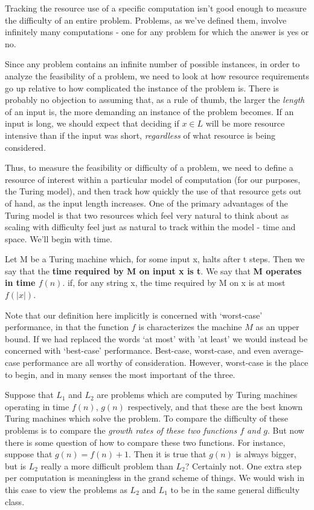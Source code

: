 Tracking the resource use of a specific computation isn't good enough to measure the difficulty of an entire problem. Problems, as we've defined them, involve infinitely many computations - one for any problem for which the answer is yes or no. 

Since any problem contains an infinite number of possible instances, in order to analyze the feasibility of a problem, we need to look at how resource requirements go up relative to how complicated the instance of the problem is. There is probably no objection to assuming that, as a rule of thumb, the larger the \textit{length} of an input is, the more demanding an instance of the problem becomes. If an input is long, we should expect that deciding if $x\in L$ will be more resource intensive than if the input was short, \textit{regardless} of what resource is being considered.

Thus, to measure the feasibility or difficulty of a problem, we need to define a resource of interest within a particular model of computation (for our purposes, the Turing model), and then track how quickly the use of that resource gets out of hand, as the input length increases. One of the primary advantages of the Turing model is that two resources which feel very natural to think about as scaling with difficulty feel just as natural to track within the model - time and space. We'll begin with time.

\begin{definition}
Let M be a Turing machine which, for some input x, halts after t steps. Then we say that the \textbf{time required by M on input x is t}. We say that \textbf{M operates in time $f(n)$}. if, for any string x, the time required by M on x is at most $f(|x|)$. 
\end{definition}

Note that our definition here implicitly is concerned with `worst-case' performance, in that the function $f$ is characterizes the machine $M$ as an upper bound. If we had replaced the words `at most' with 'at least' we would instead be concerned with `best-case' performance. Best-case, worst-case, and even average-case performance are all worthy of consideration. However, worst-case is the place to begin, and in many senses the most important of the three.

Suppose that $L_1$ and $L_2$ are problems which are computed by Turing machines operating in time $f(n)$, $g(n)$ respectively, and that these are the best known Turing machines which solve the problem. To compare the difficulty of these problems is to compare the \textit{growth rates of these two functions $f$ and $g$}. But now there is some question of how to compare these two functions. For instance, suppose that $g(n) = f(n)+1$. Then it is true that $g(n)$ is always bigger, but is $L_2$ really a more difficult problem than $L_2$? Certainly not. One extra step per computation is meaningless in the grand scheme of things. We would wish in this case to view the problems as $L_2$ and $L_1$ to be in the same general difficulty class. 

